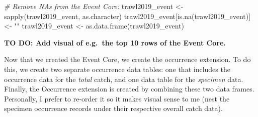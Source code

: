 \documentclass[
]{book}
\newenvironment{Shaded}{\begin{snugshade}}{\end{snugshade}}
\newcommand{\CommentTok}[1]{\textcolor[rgb]{0.56,0.35,0.01}{\textit{#1}}}
\newcommand{\FunctionTok}[1]{\textcolor[rgb]{0.00,0.00,0.00}{#1}}
\newcommand{\NormalTok}[1]{#1}
\newcommand{\OtherTok}[1]{\textcolor[rgb]{0.56,0.35,0.01}{#1}}
\newcommand{\StringTok}[1]{\textcolor[rgb]{0.31,0.60,0.02}{#1}}
\begin{document}
\begin{Shaded}
\begin{Highlighting}[]
\CommentTok{\# Remove NAs from the Event Core:}
\NormalTok{trawl2019\_event }\OtherTok{\textless{}{-}} \FunctionTok{sapply}\NormalTok{(trawl2019\_event, as.character)}
\NormalTok{trawl2019\_event[}\FunctionTok{is.na}\NormalTok{(trawl2019\_event)] }\OtherTok{\textless{}{-}} \StringTok{""}
\NormalTok{trawl2019\_event }\OtherTok{\textless{}{-}} \FunctionTok{as.data.frame}\NormalTok{(trawl2019\_event)}
\end{Highlighting}
\end{Shaded}

\textbf{TO DO: Add visual of e.g.~the top 10 rows of the Event Core.}

Now that we created the Event Core, we create the occurrence extension. To do this, we create two separate occurrence data tables: one that includes the occurrence data for the \emph{total} catch, and one data table for the \emph{specimen} data. Finally, the Occurrence extension is created by combining these two data frames. Personally, I prefer to re-order it so it makes visual sense to me (nest the specimen occurrence records under their respective overall catch data).
\end{document}
